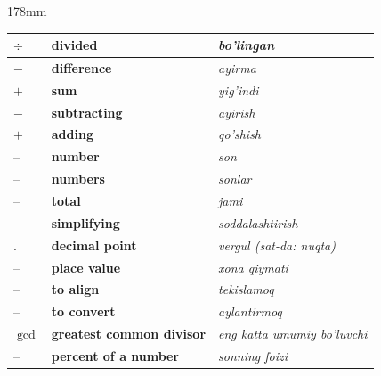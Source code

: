 \documentclass[a4paper]{article}
\begin{document}
\begin{textblock*}{178mm}
{\begin{tabular}{|>{\centering\arraybackslash}p{22mm}|p{68mm}|p{72mm}|}
$\div$ & \textbf{divided} & \textit{bo'lingan} \\ \hline
$-$ & \textbf{difference} & \textit{ayirma} \\ \hline
\rowcolor{badge!18}
$+$ & \textbf{sum} & \textit{yig'indi} \\ \hline
$-$ & \textbf{subtracting} & \textit{ayirish} \\ \hline
\rowcolor{badge!18}
$+$ & \textbf{adding} & \textit{qo'shish} \\ \hline
-- & \textbf{number} & \textit{son} \\ \hline
\rowcolor{badge!18}
-- & \textbf{numbers} & \textit{sonlar} \\ \hline
-- & \textbf{total} & \textit{jami} \\ \hline
\rowcolor{badge!18}
-- & \textbf{simplifying} & \textit{soddalashtirish} \\ \hline
$.$ & \textbf{decimal point} & \textit{vergul (sat-da: nuqta)} \\ \hline
\rowcolor{badge!18}
-- & \textbf{place value} & \textit{xona qiymati} \\ \hline
-- & \textbf{to align} & \textit{tekislamoq} \\ \hline
\rowcolor{badge!18}
-- & \textbf{to convert} & \textit{aylantirmoq} \\ \hline
$\gcd$ & \textbf{greatest common divisor} & \textit{eng katta umumiy bo'luvchi} \\ \hline
\rowcolor{badge!18}
-- & \textbf{percent of a number} & \textit{sonning foizi} \\ \hline
\end{tabular}
}
\end{textblock*}
\end{document}
